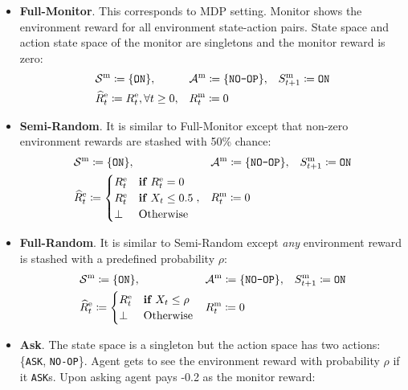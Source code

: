 \begin{itemize}[leftmargin=*]
    \item \textbf{Full-Monitor}. This corresponds to MDP setting. Monitor shows the environment reward for all environment state-action pairs. State space and action state space of the monitor are singletons and the monitor reward is zero:
    \begin{align*}
        &\mathcal{S}^\text{m} \coloneq \{\texttt{ON}\}, && \mathcal{A}^\text{m} \coloneq \{\texttt{NO-OP}\}, && S^\text{m}_{t + 1} \coloneq \texttt{ON} \\
        & \widehat{R}^\text{e}_t \coloneq R^\text{e}_t, \forall t \geq 0, && R^\text{m}_t \coloneq 0
    \end{align*}
    \item \textbf{Semi-Random}. It is similar to Full-Monitor except that non-zero environment rewards are stashed with 50\% chance:
    \begin{align*}
        &\mathcal{S}^\text{m} \coloneq \{\texttt{ON}\}, && \mathcal{A}^\text{m} \coloneq \{\texttt{NO-OP}\}, && S^\text{m}_{t + 1} \coloneq \texttt{ON} \\
        & \widehat{R}^\text{e}_t \coloneq 
        \begin{cases}
        R^\text{e}_t & \textbf{if } R^\text{e}_t = 0 \\
        R^\text{e}_t & \textbf{if } X_t \leq 0.5 \\
        \bot & \text{Otherwise}
        \end{cases},
        && R^\text{m}_t \coloneq 0
    \end{align*}
    \item \textbf{Full-Random}. It is similar to Semi-Random except \emph{any} environment reward is stashed with a predefined probability $\rho$:
    \begin{align*}
        &\mathcal{S}^\text{m} \coloneq \{\texttt{ON}\}, && \mathcal{A}^\text{m} \coloneq \{\texttt{NO-OP}\}, && S^\text{m}_{t + 1} \coloneq \texttt{ON} \\
        & \widehat{R}^\text{e}_t \coloneq 
        \begin{cases}
        R^\text{e}_t & \textbf{if }  X_t \leq \rho \\
        \bot & \text{Otherwise}
        \end{cases}
        && R^\text{m}_t \coloneq 0
    \end{align*}
    \item \textbf{Ask}. The state space is a singleton but the action space has two actions: \{\texttt{ASK}, \texttt{NO-OP}\}. Agent gets to see the environment reward with probability $\rho$ if it \texttt{ASK}s. Upon asking agent pays -0.2 as the monitor reward:

\end{itemize}
